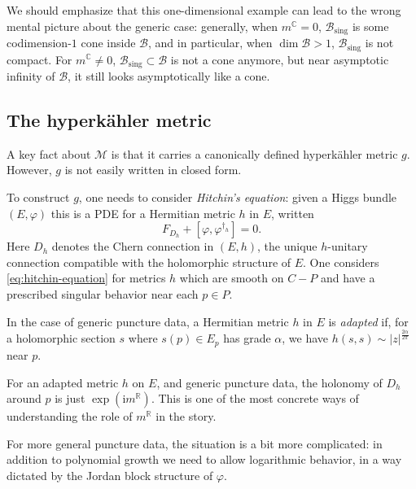 \documentclass[12pt,letterpaper,reqno]{article}
\numberwithin{equation}{section}
\newcommand{\cB}{\ensuremath{\mathcal B}}
\newcommand{\cM}{\ensuremath{\mathcal M}}
\newcommand{\R}{\ensuremath{\mathbb R}}
\newcommand{\C}{\ensuremath{\mathbb C}}
\newcommand{\hk}{hyperk\"ahler\xspace}
\newcommand{\I}{{\mathrm i}}
\newcommand{\sing}{\mathrm{sing}}
\newcommand{\abs}[1]{\lvert#1\rvert}
\newcommand{\ti}[1]{\textit{#1}}
\newcommand{\insfig}[2]{

\medskip
\noindent
\begin{minipage}{\linewidth}

\makebox[\linewidth]{\texttt{[image: figures/\#1-crop.pdf]}}

\end{minipage}
\medskip

}
\newcommand{\fixme}[1]{{\color{orange}{[#1]}}}
\begin{document}
\insfig{higgs-metric-2}{0.85}

\fixme{also do the 3-punctured $SU(3)$ case?}

We should emphasize that this one-dimensional example can lead to the
wrong mental picture about the generic case: generally,
when $m^\C = 0$, $\cB_\sing$ is some codimension-$1$ cone inside $\cB$, and in particular,
when $\dim \cB > 1$, $\cB_\sing$ is not compact. For $m^\C \neq 0$, $\cB_\sing \subset \cB$
is not a cone anymore, but near asymptotic infinity of $\cB$,
it still looks asymptotically like a cone.



\subsection{The \hk metric}

A key fact about $\cM$ is that it carries a canonically
defined \hk metric $g$. However, $g$ is not easily
written in closed form.

To construct $g$, one needs to consider \ti{Hitchin's equation}:
given a Higgs bundle $(E,\varphi)$ this is a PDE
for a Hermitian metric $h$ in $E$, written
\begin{equation} \label{eq:hitchin-equation}
  F_{D_h} + [\varphi, \varphi^{\dagger_h}] = 0.
\end{equation}
Here $D_h$ denotes the Chern connection in $(E,h)$,
the unique $h$-unitary connection compatible with
the holomorphic structure of $E$.
One considers \eqref{eq:hitchin-equation} for
metrics $h$ which are smooth on $C - P$ and
have a prescribed singular behavior near each
$p \in P$.
\begin{defn} 
In the case of generic puncture data, a Hermitian metric $h$
in $E$ is \ti{adapted} if, for a holomorphic section $s$ 
where $s(p) \in E_p$ has grade $\alpha$, we have
$h(s,s) \sim \abs{z}^{\frac{2 \alpha}{2\pi}}$ near $p$.
\end{defn}

\begin{remark}
For an adapted metric $h$ on $E$, and generic puncture data, 
the holonomy of $D_h$ around $p$
is just $\exp(\I m^\R)$. This is one of the most concrete ways
of understanding the role of $m^\R$ in the story.
\end{remark}

For more general puncture data, the situation is a bit 
more complicated: in addition to polynomial growth
we need to allow logarithmic behavior, in a way dictated
by the Jordan block structure of $\varphi$. \fixme{cite Simpson}
\end{document}
